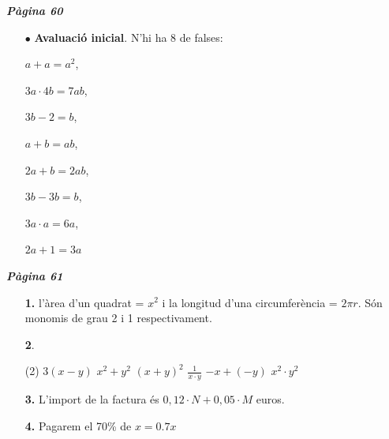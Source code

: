 \documentclass[a4paper, pdf, twoside]{book}
\begin{document}
\begin{multicols}{2}
{\textbf{\em Pàgina 60}} \hrulefill
\begin{enumerate}
\vspace{0.25cm}
 \item[$\bullet$ ] {\selectfont\color{blue}\textbf{Avaluació inicial}. }
N'hi ha 8 de falses:\par $a+a=a^2$,\par $3a\cdot 4b=7ab$,\par $3b-2=b$,\par $a+b=ab$,\par $2a+b=2ab$,\par $3b-3b=b$,\par $3a\cdot a=6a$,\par $2a+1=3a$
 \end{enumerate}
\vspace{0.3cm}


{\textbf{\em Pàgina 61}} \hrulefill
\begin{enumerate}
\vspace{0.25cm}
\item[\fontfamily{phv}\selectfont\color{blue}\textbf{1. }] 
l'àrea d'un quadrat = $x^2$ i la longitud d'una circumferència = $2\pi r$. Són monomis de grau 2 i 1 respectivament.
 \end{enumerate}
\begin{enumerate}
\vspace{0.25cm}



 \item[\fontfamily{phv}\selectfont\color{blue}\textbf{2}. ] 
 \begin{tasks}[column-sep=1em, item-indent=1.3333em](2)
	 \task $3(x-y)$
	 \task $x^2+y^2$
	 \task $(x+y)^2$
	 \task $\frac {1}{x\cdot y}$
	 \task $-x+(-y)$
	 \task $x^2\cdot y^2$
\end{tasks}
\vspace{0.25cm}
\item[\fontfamily{phv}\selectfont\color{blue}\textbf{3. }] 
L'import de la factura és $0,12 \cdot N + 0,05\cdot M$ euros.
\vspace{0.25cm}
\item[\fontfamily{phv}\selectfont\color{blue}\textbf{4. }] 
Pagarem el 70\% de $x=0.7 x$
 \end{enumerate}
\vspace{0.3cm}



\end{multicols}
\end{document}
